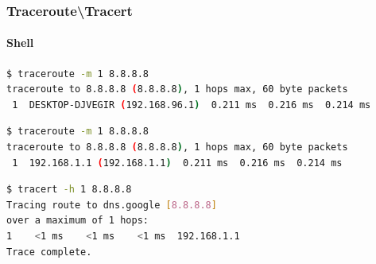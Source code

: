 \subsubsection{Traceroute\textbackslash Tracert}
\paragraph{Shell}
\begin{lstlisting}[language=Bash, caption=Linux traceroute]
$ traceroute -m 1 8.8.8.8 
traceroute to 8.8.8.8 (8.8.8.8), 1 hops max, 60 byte packets
 1  DESKTOP-DJVEGIR (192.168.96.1)  0.211 ms  0.216 ms  0.214 ms
\end{lstlisting}
\begin{lstlisting}[language=Bash, caption=Darwin traceroute]
$ traceroute -m 1 8.8.8.8 
traceroute to 8.8.8.8 (8.8.8.8), 1 hops max, 60 byte packets
 1  192.168.1.1 (192.168.1.1)  0.211 ms  0.216 ms  0.214 ms
\end{lstlisting}
\begin{lstlisting}[language=Bash, caption=Windows tracert]
$ tracert -h 1 8.8.8.8
Tracing route to dns.google [8.8.8.8]
over a maximum of 1 hops:
1    <1 ms    <1 ms    <1 ms  192.168.1.1
Trace complete.    
\end{lstlisting}
